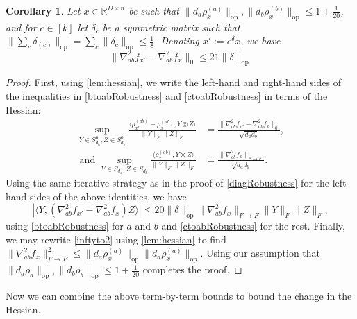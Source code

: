 \documentclass[aos]{imsart}
\newtheorem{corollary}[theorem]{Corollary}
\theoremstyle{definition}
\numberwithin{equation}{section}
\DeclareMathOperator{\op}{op}
\newcommand{\R}{{\mathbb{R}}}
\newcommand{\smallSym}{S}
\newcommand{\samp}{x}
\begin{document}
\begin{appendix}
\begin{corollary} \label{offdiagRobustness}
Let $\samp \in \R^{D \times n}$ be such that $\|d_{a} \rho_{\samp}^{(a)}\|_{\op}, \|d_{b} \rho_{\samp}^{(b)}\|_{\op} \leq 1+\frac{1}{20}$, and for $c \in [k]$ let $\delta_c$ be a symmetric matrix such that $\|\sum_{c} \delta_{(c)}\|_{\op} = \sum_{c} \|\delta_{c}\|_{\op} \leq \frac{1}{8}$. Denoting $\samp' := e^{\delta} \samp$, we have
\[ \|\nabla^{2}_{ab} f_{\samp'} - \nabla^{2}_{ab} f_{\samp}\|_{0} \leq 21 \|\delta\|_{\op}  \]
\end{corollary}
\begin{proof}
First, using \cref{lem:hessian}, we write the left-hand and right-hand sides of the inequalities in \cref{btoabRobustness} and \cref{ctoabRobustness} in terms of the Hessian:
\begin{align*}
\sup_{Y \in \smallSym_{d_{a}}^{0}, Z \in \smallSym_{d_{b}}^{0}} \frac{\langle \rho_{\samp'}^{(ab)} - \rho_{\samp}^{(ab)}, Y \otimes Z \rangle}{\|Y\|_{F} \|Z\|_{F}} &= \frac{\|\nabla^{2}_{ab} f_{\samp'} - \nabla^{2}_{ab} f_{\samp}\|_{0}}{\sqrt{d_{a} d_{b}} }, \\
\text{ and }\sup_{Y \in \smallSym_{d_{a}}, Z \in \smallSym_{d_{b}}} \frac{\langle \rho_{\samp}^{(ab)}, Y \otimes Z \rangle}{\|Y\|_{F} \|Z\|_{F}} &= \frac{\|\nabla^{2}_{ab} f_{\samp}\|_{F \to F}}{\sqrt{d_{a} d_{b}} }   .
\end{align*}
Using the same iterative strategy as in the proof of \cref{diagRobustness} for the left-hand sides of the above identities, we have
\[ |\langle Y, (\nabla^{2}_{ab} f_{\samp'} - \nabla^{2}_{ab} f_{\samp}) Z \rangle| \leq 20 \|\delta\|_{\op} \|\nabla^{2}_{ab} f_{\samp}\|_{F \to F} \|Y\|_{F} \|Z\|_{F} ,   \]
using \cref{btoabRobustness} for $a$ and $b$ and \cref{ctoabRobustness} for the rest. Finally, we may rewrite \cref{inftyto2} using \cref{lem:hessian} to find $\|\nabla^{2}_{ab} f_{\samp}\|_{F \to F}^{2} \leq \|d_{a} \rho_{\samp}^{(a)}\|_{\op} \|d_{a} \rho_{\samp}^{(a)}\|_{\op}$. Using our assumption that $\|d_{a} \rho_{a}\|_{\op}, \|d_{b} \rho_{b}\|_{\op} \leq 1 + \frac{1}{20}$ completes the proof.
\end{proof}

Now we can combine the above term-by-term bounds to bound the change in the Hessian.


\end{appendix}
\end{document}
